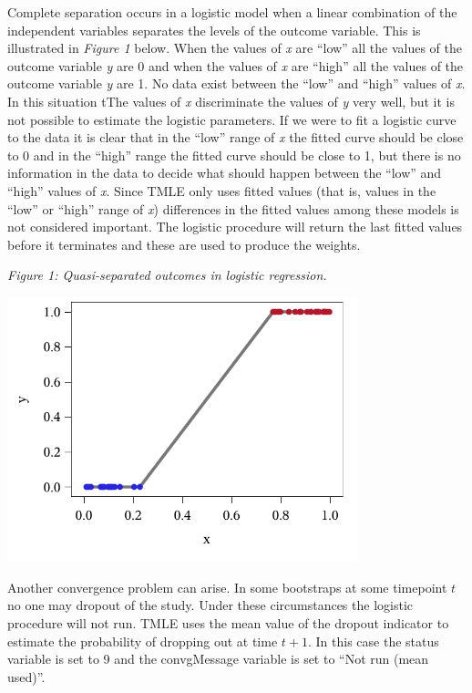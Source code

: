 \documentclass[10pt]{article}
\renewcommand{\baselinestretch}{1.3}
\begin{document}
Complete separation occurs in a logistic model when a linear combination of the independent variables separates the levels of the outcome variable.  This is illustrated in {\em Figure 1} below.  When the values of {\em x} are ``low'' all the values of the outcome variable {\em y} are 0 and when the values of {\em x} are ``high'' all the values of the outcome variable {\em y} are 1.  No data exist between the ``low'' and ``high'' values of {\em x}.  In this situation tThe values of {\em x} discriminate the values of {\em y} very well, but it is not possible to estimate the logistic parameters.  If we were to fit a logistic curve to the data it is clear that in the ``low'' range of {\em x} the fitted curve should be close to 0 and in the ``high'' range the fitted curve should be close to 1, but there is no information in the data to  decide what should happen between the ``low'' and ``high'' values of {\em x}.   Since TMLE only uses fitted values (that is, values in the ``low'' or ``high'' range of {\em x}) differences in the fitted values among these models is not considered important. The logistic procedure will return the last fitted values before it terminates and these are used to produce the weights.
\vspace{0.2in}

\hspace{0.8in}\begin{minipage}[t]{5in}
{\renewcommand{\baselinestretch}{1.0}\selectfont
\hspace{0.4in}\begin{minipage}[t]{4.0in}
{\normalsize \em Figure 1: Quasi-separated outcomes in logistic regression.}
\end{minipage}}\vspace{0.02in}

{
\includegraphics[width=4in]{quasi.pdf}
}
\end{minipage}
\vspace{0.1in}

Another convergence problem can arise. In some bootstraps at some timepoint $t$ no one may dropout of the study.  Under these circumstances the logistic procedure will not run.  TMLE uses the mean value of the dropout indicator to estimate the probability of dropping out at time $t+1$. In this case the status variable is set to 9 and the convgMessage variable is set to ``Not run (mean used)''.

\newpage

{}
\end{document}
